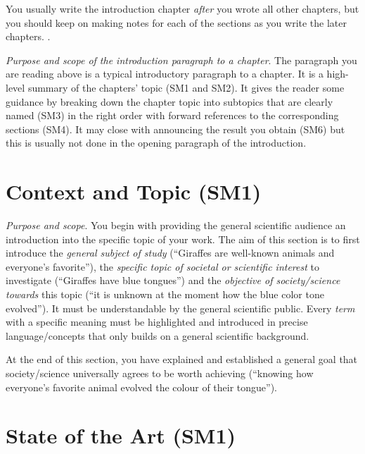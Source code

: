 You usually write the introduction chapter \emph{after} you wrote all other chapters, but you should keep on making notes for each of the sections as you write the later chapters.
.

\emph{Purpose and scope of the introduction paragraph to a chapter}.
The paragraph you are reading above is a typical introductory paragraph to a chapter.
It is a high-level summary of the chapters' topic (SM1 and SM2).
It gives the reader some guidance by breaking down the chapter topic into subtopics that are clearly named (SM3) in the right order with forward references to the corresponding sections (SM4).
It may close with announcing the result you obtain (SM6) but this is usually not done in the opening paragraph of the introduction.

\section{Context and Topic (SM1)}\label{sec:introduction:topic}

\emph{Purpose and scope}.
You begin with providing the general scientific audience an introduction into the specific topic of your work.
The aim of this section is to first introduce the \emph{general subject of study} (``Giraffes are well-known animals and everyone's favorite''), the \emph{specific topic of societal or scientific interest} to investigate (``Giraffes have blue tongues'') and the \emph{objective of society/science towards} this topic (``it is unknown at the moment how the blue color tone evolved'').
It must be understandable by the general scientific public.
Every \emph{term} with a specific meaning must be highlighted and introduced in precise language/concepts that only builds on a general scientific background.

At the end of this section, you have explained and established a general goal that society/science universally agrees to be worth achieving (``knowing how everyone's favorite animal evolved the colour of their tongue'').

\section{State of the Art (SM1)}\label{sec:introduction:state-of-art}

